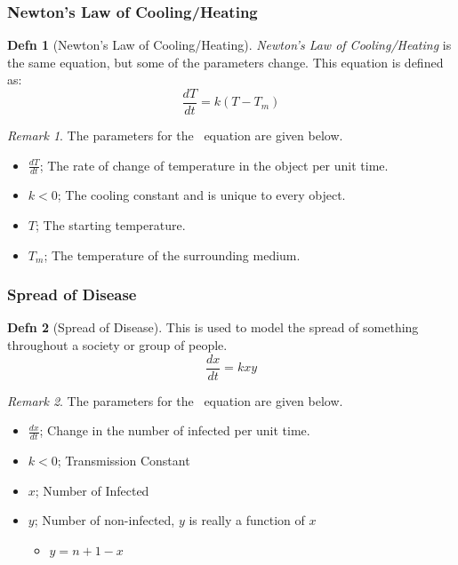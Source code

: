 \documentclass[10pt,letterpaper,final,twoside,notitlepage]{article}
\theoremstyle{plain}
\theoremstyle{definition}
\newtheorem{definition}{Defn}
\theoremstyle{remark}
\newtheorem{remark}{Remark}[definition]
\begin{document}
		\subsubsection{Newton's Law of Cooling/Heating} \label{subsubsec:Newton Law of Cooling/Heating}
			\begin{definition}[Newton's Law of Cooling/Heating] \label{def:Newton Law of Cooling/Heating}
				\emph{Newton's Law of Cooling/Heating} is the same equation, but some of the parameters change.
				This equation is defined as:
				\begin{equation} \label{eq:Newton Law of Cooling/Heating}
					\frac{dT}{dt} = k \left( T-T_{m} \right)
				\end{equation}
				\begin{remark} \label{rmk:Newton Law of Cooling/Heating Parameters}
					The parameters for the ~equation are given below.
					\begin{itemize}[noitemsep, nolistsep]
						\item $\frac{dT}{dt}$; The rate of change of temperature in the object per unit time.
						\item $k<0$; The cooling constant and is unique to every object.
						\item $T$; The starting temperature.
						\item $T_{m}$; The temperature of the surrounding medium.
					\end{itemize}
				\end{remark}
			\end{definition}
		\subsubsection{Spread of Disease} \label{subsubsec:Spread of Disease}
			\begin{definition}[Spread of Disease] \label{def:Spread of Disease}
				This is used to model the spread of something throughout a society or group of people.
				\begin{equation} \label{eq:Spread of Disease}
					\frac{dx}{dt} = kxy
				\end{equation}
				\begin{remark}
					The parameters for the ~equation are given below.
					\begin{itemize}[noitemsep, nolistsep]
						\item $\frac{dx}{dt}$; Change in the number of infected per unit time.
						\item $k<0$; Transmission Constant
						\item$x$; Number of Infected
						\item $y$; Number of non-infected, $y$ is really a function of $x$
						\begin{itemize}[noitemsep, nolistsep]
							\item $y = n+1-x$
						\end{itemize}
					\end{itemize}
				\end{remark}
			\end{definition}
		
\end{document}

